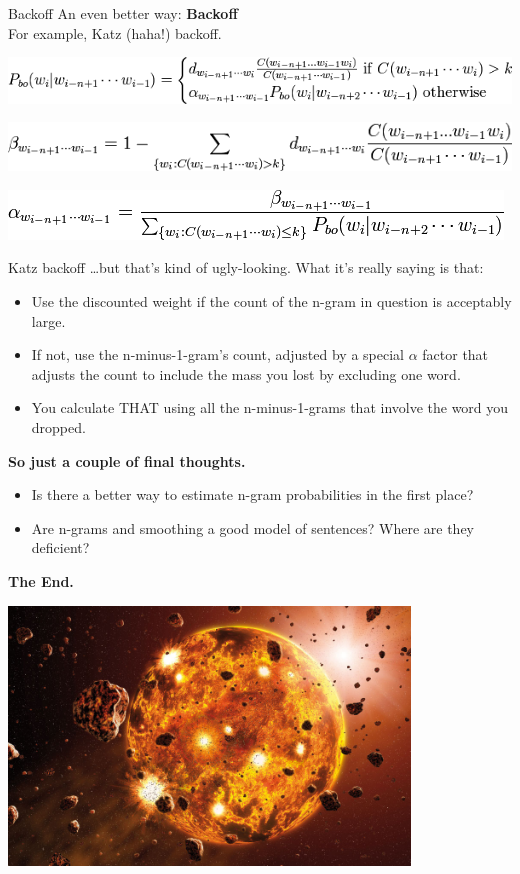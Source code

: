\documentclass{beamer}
\newcommand{\pagestepalt}[2]{
  \begin{frame}[t]
    \begin{minipage}[t][0.26\textheight][t]{\textwidth}
      \begin{center}
        \huge
        \textbf{#1}
      \end{center}
    \end{minipage}
    
    \begin{minipage}[t][0.7\textheight][t]{\textwidth}
      #2
    \end{minipage}
  \end{frame}
}
\begin{document}
\begin{frame}{Backoff}
  An even better way: \textbf{Backoff}
  \\ For example, Katz (haha!) backoff.
  \begin{block}{}   
    \includegraphics[width=\textwidth]{images/katzP.png}
  \end{block}
  \begin{block}{}
    \includegraphics[width=\textwidth]{images/katzB.png}
  \end{block}
  \begin{block}{} 
    \includegraphics[width=\textwidth]{images/katzA.png}
  \end{block}
\end{frame}

\begin{frame}{Katz backoff}
  \ldots but that's kind of ugly-looking. What it's really saying is that:\pause
  \begin{itemize}
    \item Use the discounted weight if the count of the n-gram in question 
      is acceptably large.\pause
    \item If not, use the n-minus-1-gram's count, adjusted by a 
      special $\alpha$ factor that adjusts the count to include 
      the mass you lost by excluding one word.\pause
    \item You calculate THAT using all the n-minus-1-grams that
      involve the word you dropped.
  \end{itemize}
\end{frame}

\pagestepalt{So just a couple of final thoughts.}{
  \begin{itemize}
  \item Is there a better way to estimate n-gram probabilities in the first place?\pause 
  \item Are n-grams and smoothing a good model of sentences? Where are they 
    deficient?
  \end{itemize}
}




\pagestepalt{The End.}{
  \begin{center}
    \includegraphics[width=0.8\textwidth]{images/formation.jpg}
  \end{center}
}
\end{document}
